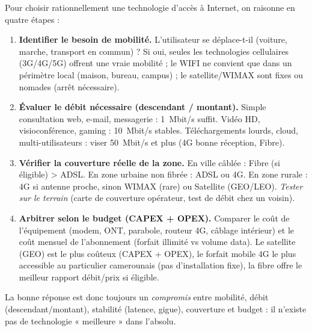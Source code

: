 \documentclass[11pt]{article}
\begin{document}
\begin{methode}
Pour choisir rationnellement une technologie d'accès à Internet, on raisonne en quatre étapes :
\begin{enumerate}
\item \textbf{Identifier le besoin de mobilité.} L'utilisateur se déplace-t-il (voiture, marche, transport en commun) ? Si oui, seules les technologies cellulaires (3G/4G/5G) offrent une vraie mobilité ; le WIFI ne convient que dans un périmètre local (maison, bureau, campus) ; le satellite/WIMAX sont fixes ou nomades (arrêt nécessaire).
\item \textbf{Évaluer le débit nécessaire (descendant / montant).} Simple consultation web, e-mail, messagerie : \SI{1}{Mbit/s} suffit. Vidéo HD, visioconférence, gaming : \SI{10}{Mbit/s} stables. Téléchargements lourds, cloud, multi-utilisateurs : viser \SI{50}{Mbit/s} et plus (4G bonne réception, Fibre).
\item \textbf{Vérifier la couverture réelle de la zone.} En ville câblée : Fibre (si éligible) > ADSL. En zone urbaine non fibrée : ADSL ou 4G. En zone rurale : 4G si antenne proche, sinon WIMAX (rare) ou Satellite (GEO/LEO). \emph{Tester sur le terrain} (carte de couverture opérateur, test de débit chez un voisin).
\item \textbf{Arbitrer selon le budget (CAPEX + OPEX).} Comparer le coût de l'équipement (modem, ONT, parabole, routeur 4G, câblage intérieur) et le coût mensuel de l'abonnement (forfait illimité vs volume data). Le satellite (GEO) est le plus coûteux (CAPEX + OPEX), le forfait mobile 4G le plus accessible au particulier camerounais (pas d'installation fixe), la fibre offre le meilleur rapport débit/prix si éligible.
\end{enumerate}
La bonne réponse est donc toujours un \emph{compromis} entre mobilité, débit (descendant/montant), stabilité (latence, gigue), couverture et budget : il n'existe pas de technologie « meilleure » dans l'absolu.
\end{methode}
\end{document}
